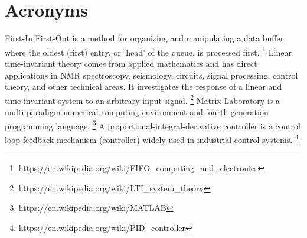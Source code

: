 \section{Acronyms}
\label{acronyms}

\begin{acronym}
		First-In First-Out is a method for organizing and manipulating a data buffer,
		where the oldest (first) entry, or 'head' of the queue, is processed first.
		\footnote{https://en.wikipedia.org/wiki/FIFO\_computing\_and\_electronics}
		Linear time-invariant theory comes from applied mathematics and has
		direct applications in NMR spectroscopy, seismology, circuits, signal
		processing, control theory, and other technical areas. It investigates
		the response of a linear and time-invariant system to an arbitrary
		input signal.
		\footnote{https://en.wikipedia.org/wiki/LTI\_system\_theory}
		Matrix Laboratory is a multi-paradigm numerical computing environment
		and fourth-generation programming language.
		\footnote{https://en.wikipedia.org/wiki/MATLAB}
		A proportional-integral-derivative controller is a control loop
		feedback mechanism (controller) widely used in industrial control
		systems.
		\footnote{https://en.wikipedia.org/wiki/PID\_controller}
\end{acronym}